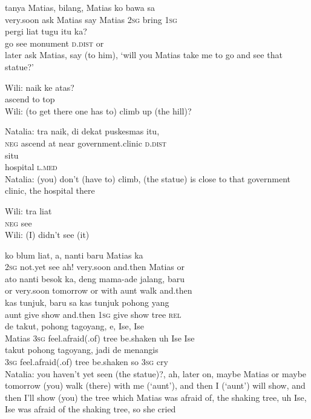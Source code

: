 \ea
{}    {tanya}    {Matias,}    {bilang,}   Matias   ko   bawa   sa\\
   {very.soon}    {ask}    {Matias}    {say}   Matias   \textsc{2sg}   bring   \textsc{1sg}\\
\gll pergi    {liat}    {tugu}    {itu}    {ka?}\\
  go    {see}    {monument}    {\textsc{d.dist}}    {or}\\
\glt
later ask Matias, say (to him), ‘will you Matias take me to go and see that statue?’
\z

\ea
\gll   Wili:   naik   ke   atas?\\
  {} ascend   to   top\\
\glt
Wili: (to get there one has to) climb up (the hill)?
\z

\ea
\gll   Natalia:    {tra}   naik,   di   dekat   puskesmas   itu,\\
  {} {\textsc{neg}}   ascend   at   near   government.clinic   \textsc{d.dist}\\
    {situ}\\
   {hospital}    {\textsc{l.med}}\\
\glt
Natalia: (you) don’t (have to) climb, (the statue) is close to that government clinic, the hospital there
\z

\ea
\gll   Wili:   tra   liat\\
  {}   \textsc{neg}   see\\
\glt
Wili: (I) didn’t see (it)
\z

\ea
{}    {ko}    {blum}    {liat,}    {a,}    {nanti}    {baru}    {Matias}   ka\\
   {}    {\textsc{2sg}}    {not.yet}    {see}    {ah!}    {very.soon}    {and.then}    {Matias}   or\\
\gll ato    {nanti}    {besok}    {ka,}    {deng}    {mama-ade}    {jalang,}    {baru}\\
  or    {very.soon}    {tomorrow}    {or}    {with}    {aunt}    {walk}    {and.then}\\
    {kas}    {tunjuk,}    {baru}    {sa}    {kas}    {tunjuk}    {pohong}   yang\\
   {aunt}    {give}    {show}    {and.then}    {\textsc{1sg}}    {give}    {show}    {tree}   \textsc{rel}\\
    {de}    {takut,}    {pohong}    {tagoyang,}    {e,}    {Ise,}    {Ise}\\
   {Matias}    {\textsc{3sg}}    {feel.afraid(.of)}    {tree}    {be.shaken}    {uh}    {Ise}    {Ise}\\
    {takut}    {pohong}    {tagoyang,}    {jadi}    {de}    {menangis}\\
   {\textsc{3sg}}    {feel.afraid(.of)}    {tree}    {be.shaken}    {so}    {\textsc{3sg}}    {cry}\\
\glt
Natalia: you haven’t yet seen (the statue)?, ah, later on, maybe Matias or maybe tomorrow (you) walk (there) with me (‘aunt’), and then I (‘aunt’) will show, and then I’ll show (you) the tree which Matias was afraid of, the shaking tree, uh Ise, Ise was afraid of the shaking tree, so she cried
\z


